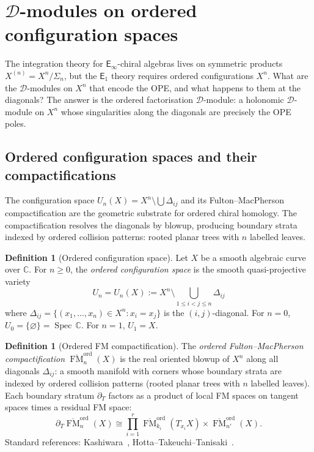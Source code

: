 \documentclass[11pt,reqno]{amsart}
\theoremstyle{definition}
\newtheorem{definition}[theorem]{Definition}
\theoremstyle{remark}
\newcommand{\cD}{\mathcal{D}}
\newcommand{\Eone}{\mathsf{E}_{1}}
\newcommand{\Einf}{\mathsf{E}_{\infty}}
\DeclareMathOperator{\FM}{FM}
\DeclareMathOperator{\Spec}{Spec}
\newcommand{\CC}{\mathbb{C}}
\numberwithin{equation}{section}
\begin{document}
\section{$\cD$-modules on ordered configuration spaces}
\label{sec:dmod-ordered}

The integration theory for $\Einf$-chiral algebras lives on
symmetric products $X^{(n)} = X^n/\Sigma_n$, but the
$\Eone$ theory requires ordered configurations $X^n$.
What are the $\cD$-modules on $X^n$ that encode the OPE,
and what happens to them at the diagonals? The answer
is the ordered factorisation $\cD$-module: a holonomic
$\cD$-module on $X^n$ whose singularities along the
diagonals are precisely the OPE poles.

\subsection{Ordered configuration spaces and their
compactifications}
\label{subsec:config}

The configuration space $U_n(X) = X^n \setminus
\bigcup \Delta_{ij}$ and its Fulton--MacPherson
compactification are the geometric substrate for
ordered chiral homology. The compactification resolves
the diagonals by blowup, producing boundary strata
indexed by ordered collision patterns: rooted planar trees
with $n$ labelled leaves.

\begin{definition}[Ordered configuration space]
\label{def:ord-conf}
Let $X$ be a smooth algebraic curve over $\CC$.
For $n \geq 0$, the \emph{ordered configuration space} is
the smooth quasi-projective variety
\begin{equation}\label{eq:ord-conf}
  U_n = U_n(X)
  := X^n \setminus \bigcup_{1 \leq i < j \leq n} \Delta_{ij}
\end{equation}
where $\Delta_{ij} = \{(x_1, \ldots, x_n) \in X^n :
x_i = x_j\}$ is the $(i,j)$-diagonal.
For $n = 0$, $U_0 = \{\varnothing\} = \Spec\,\CC$.
For $n = 1$, $U_1 = X$.
\end{definition}

\begin{definition}[Ordered FM compactification]
\label{def:ord-fm}
The \emph{ordered Fulton--MacPherson compactification}
$\overline{\FM}_n^{\mathrm{ord}}(X)$ is the real oriented
blowup of $X^n$ along all diagonals $\Delta_{ij}$:
a smooth manifold with corners whose boundary strata are
indexed by ordered collision patterns (rooted planar trees
with $n$ labelled leaves). Each boundary stratum
$\partial_T$ factors as a product of local FM spaces on
tangent spaces times a residual FM space:
\begin{equation}\label{eq:fm-stratum}
  \partial_T \overline{\FM}_n^{\mathrm{ord}}(X)
  \cong
  \textstyle\prod_{i=1}^r
  \overline{\FM}_{k_i}^{\mathrm{ord}}(T_{x_i} X)
  \times
  \overline{\FM}_{n'}^{\mathrm{ord}}(X).
\end{equation}
Standard references:
Kashiwara~\cite{Kashiwara03},
Hotta--Takeuchi--Tanisaki~\cite{HTT08}.
\end{definition}
\end{document}
